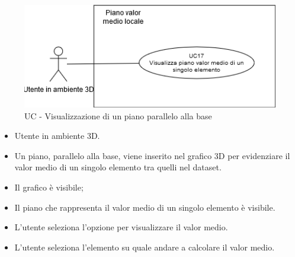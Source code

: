 \begin{figure}[h!]\centering
    \includegraphics[scale=0.7]{template/images/UC17.png}
    \caption{UC - Visualizzazione di un piano parallelo alla base}
\end{figure}
\UCdsc
{ %
    \begin{itemize}
        \item Utente in ambiente 3D.
    \end{itemize}
}
{ %
    \begin{itemize}
        \item Un piano, parallelo alla base, viene inserito nel grafico 3D per evidenziare il valor medio di un singolo elemento tra quelli nel dataset.
    \end{itemize}
}
{ %
    \begin{itemize}
        \item Il grafico è visibile;
    \end{itemize}
}
{ %
    \begin{itemize}
        \item Il piano che rappresenta il valor medio di un singolo elemento è visibile.
    \end{itemize}
}
{ %
    \begin{itemize}
        \item L'utente seleziona l'opzione per visualizzare il valor medio.
        \item L'utente seleziona l'elemento su quale andare a calcolare il valor medio.
    \end{itemize}
}

